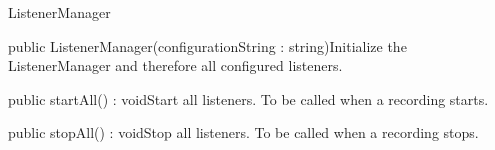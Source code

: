 \begin{class}{ListenerManager}


\begin{constructors}
\begin{constructor}{public ListenerManager(configurationString : string)}{Initialize the ListenerManager and therefore all configured listeners.}
\begin{parameters}
\end{parameters}
\end{constructor}
\end{constructors}
\begin{methods}
\begin{method}{public startAll() : void}{Start all listeners. To be called when a recording starts.}
\end{method}
\begin{method}{public stopAll() : void}{Stop all listeners. To be called when a recording stops.}
\end{method}
\end{methods}
\end{class}

